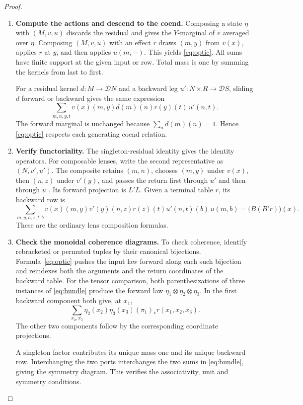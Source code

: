 \documentclass[11pt,a4paper]{article}
\theoremstyle{definition}
\newcommand{\D}{\mathcal D}
\begin{document}
\begin{proof}\leavevmode
    \begin{enumerate}[titledsteps]
        \item \textbf{Compute the actions and descend to the coend.} Composing a state $\eta$ with $(M,v,u)$ discards the residual and gives the $Y$-marginal of $v$ averaged over $\eta$. Composing $(M,v,u)$ with an effect $r$ draws $(m,y)$ from $v(x)$, applies $r$ at $y$, and then applies $u(m,-)$. This yields \eqref{eq:optic}. All sums have finite support at the given input or row. Total mass is one by summing the kernels from last to first.

        For a residual kernel $d:M\to\D N$ and a backward leg $u':N\times R\to\D S$, sliding $d$ forward or backward gives the same expression
        \[
            \sum_{m,n,y,t} v(x)(m,y)d(m)(n)r(y)(t)\,u'(n,t).
        \]
        The forward marginal is unchanged because $\sum_n d(m)(n)=1$. Hence \eqref{eq:optic} respects each generating coend relation.

        \item \textbf{Verify functoriality.} The singleton-residual identity gives the identity operators. For composable lenses, write the second representative as $(N,v',u')$. The composite retains $(m,n)$, chooses $(m,y)$ under $v(x)$, then $(n,z)$ under $v'(y)$, and passes the return first through $u'$ and then through $u$ \cite[Definition~3.3.4]{bolt}. Its forward projection is $L'L$. Given a terminal table $r$, its backward row is
        \[
            \sum_{m,y,n,z,t,b}v(x)(m,y)v'(y)(n,z)r(z)(t)u'(n,t)(b)\,u(m,b)
            =\bigl(B(B'r)\bigr)(x).
        \]
        These are the ordinary lens composition formulas.

        \item \textbf{Check the monoidal coherence diagrams.} To check coherence, identify rebracketed or permuted tuples by their canonical bijections. Formula~\eqref{eq:optic} pushes the input law forward along each such bijection and reindexes both the arguments and the return coordinates of the backward table. For the tensor comparison, both parenthesizations of three instances of \eqref{eq:bundle} produce the forward law $\eta_1\otimes\eta_2\otimes\eta_3$. In the first backward component both give, at $x_1$,
        \[
            \sum_{x_2,x_3}\eta_2(x_2)\eta_3(x_3)(\pi_1)_*r(x_1,x_2,x_3).
        \]
        The other two components follow by the corresponding coordinate projections.

        A singleton factor contributes its unique mass one and its unique backward row. Interchanging the two ports interchanges the two sums in \eqref{eq:bundle}, giving the symmetry diagram. This verifies the associativity, unit and symmetry conditions.


\end{enumerate}
\end{proof}
\end{document}
